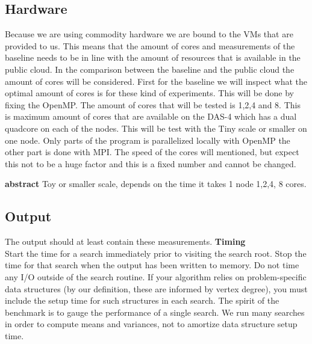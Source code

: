 \subsection{Hardware}
Because we are using commodity hardware we are  bound to the VMs that are provided to us. This means that the amount of cores and measurements of the baseline needs to be in line with the amount of resources that is available in the public cloud.
In the comparison between the baseline and the public cloud the amount of cores will be considered. First for the baseline we will inspect what the optimal amount of cores is for these kind of experiments. This will be done by fixing the OpenMP.
The amount of cores that will be tested is 1,2,4 and 8. This is maximum amount of cores that are available on the DAS-4 which has a dual quadcore on each of the nodes. This will be test with the Tiny scale or smaller on one node. Only parts of the program is parallelized locally with OpenMP the other part is done with MPI. 
The speed of the cores will mentioned, but expect this not to be a huge factor and this is a fixed number and cannot be changed. 

\textbf{abstract}
Toy or smaller scale, depends on the time it takes 1 node 1,2,4, 8 cores.

\subsection{Output}
The output should at least contain these measurements.
\textbf{Timing} \\
Start the time for a search immediately prior to visiting the search root. Stop the time for that search when the output has been written to memory. Do not time any I/O outside of the search routine. If your algorithm relies on problem-specific data structures (by our definition, these are informed by vertex degree), you must include the setup time for such structures in each search. The spirit of the benchmark is to gauge the performance of a single search. We run many searches in order to compute means and variances, not to amortize data structure setup time.


